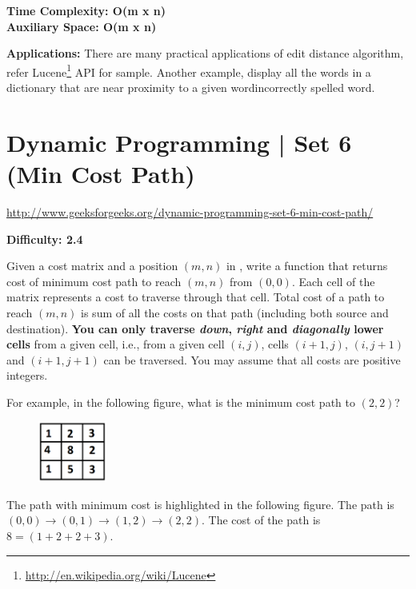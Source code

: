 \noindent{}\textbf{Time Complexity: O(m x n)}\\
\noindent{}\textbf{Auxiliary Space: O(m x n)}

\textbf{Applications:} There are many practical applications of edit
distance algorithm, refer
Lucene\footnote{\url{http://en.wikipedia.org/wiki/Lucene}} API for sample.
Another example, display all the words in a dictionary that are near
proximity to a given wordincorrectly spelled word.


\section{Dynamic Programming | Set 6 (Min Cost Path)
  \label{secGFGDPSet6MinCostPath}}

\url{http://www.geeksforgeeks.org/dynamic-programming-set-6-min-cost-path/}

\textbf{Difficulty: 2.4}

Given a cost matrix  and a position $(m, n)$ in
, write a function that returns cost of minimum cost path to
reach $(m,n)$ from $(0,0)$. Each cell of the matrix represents a cost to
traverse through that cell. Total cost of a path to reach $(m,n)$ is sum of
all the costs on that path (including both source and destination).
\textbf{You can only traverse \emph{down}, \emph{right} and
  \emph{diagonally} lower cells} from a given cell, i.e., from a given cell
$(i,j)$, cells $(i+1,j)$, $(i,j+1)$ and $(i+1,j+1)$ can be traversed. You
may assume that all costs are positive integers.

For example, in the following figure, what is the minimum cost path to 
$(2,2)$?

\begin{figure}
\centering
\includegraphics[width=0.2\textwidth]{Images/figGFGDPSet6MinCostPath1}
\label{figGFGDPSet6MinCostPath1}
\end{figure}

The path with minimum cost is highlighted in the following figure. The path
is $(0,0)\to(0,1)\to(1,2)\to(2,2)$. The cost of the path is $8=(1+2+2+3)$.

